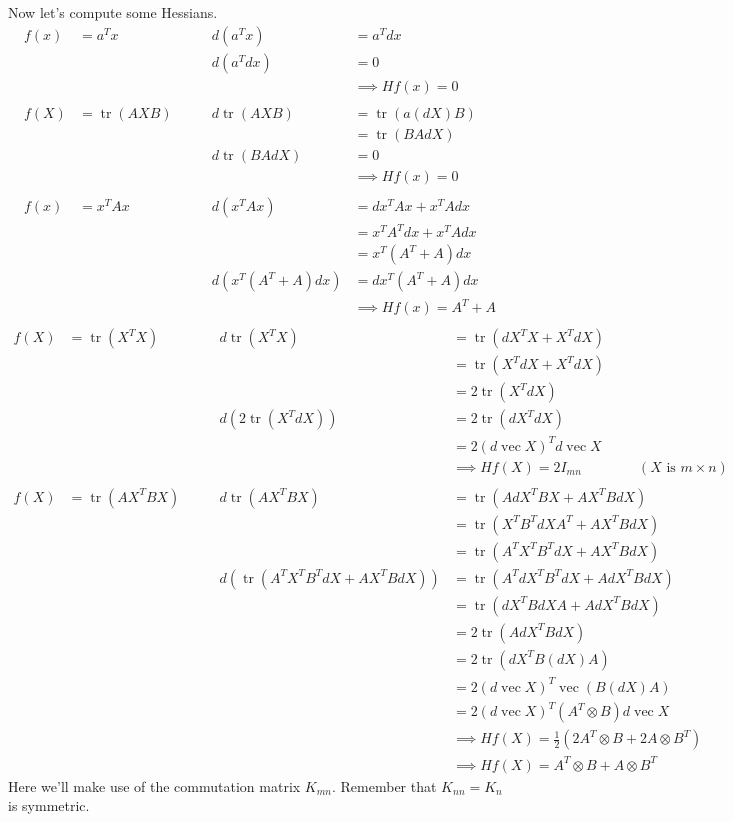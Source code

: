 \documentclass[a4paper,12pt]{article}
\begin{document}
Now let's compute some Hessians.
$$
\begin{alignat}{2}
f(x) &= a^Tx & \qquad d(a^Tx) &= a^Tdx \\
  & & \qquad d(a^Tdx) &= 0 \\
  & & &\implies Hf(x) = 0 \\
\\
f(X) &= \operatorname{tr}(AXB) & \qquad d\operatorname{tr}(AXB) &= \operatorname{tr}(a(dX)B) \\
  & & &= \operatorname{tr}(BAdX) \\
  & & \qquad d\operatorname{tr}(BAdX) &= 0 \\
  & & &\implies Hf(x) = 0 \\
\\
f(x) &= x^TAx & \qquad d(x^TAx) &= dx^TAx + x^TAdx \\
  & & &= x^TA^Tdx + x^TAdx \\
  & & &= x^T(A^T+A)dx \\
  & & \qquad d(x^T(A^T+A)dx) &= dx^T(A^T+A)dx \\
  & & &\implies Hf(x) = A^T + A \\
\end{alignat} $$
$$\begin{alignat}{2}
f(X) &= \operatorname{tr}(X^TX) & \qquad d\operatorname{tr}(X^TX) &= \operatorname{tr}(dX^TX + X^TdX) \\
  & & &= \operatorname{tr}(X^TdX + X^TdX) \\
  & & &= 2\operatorname{tr}(X^TdX) \\
  & & \qquad d(2\operatorname{tr}(X^TdX)) &= 2\operatorname{tr}(dX^TdX) \\
  & & &= 2(d\operatorname{vec}X)^Td\operatorname{vec}X \\
  & & &\implies Hf(X) = 2I_{mn}\qquad\qquad (X\text{ is }m\times n) \\
\\
f(X) &= \operatorname{tr}(AX^TBX) & \qquad d\operatorname{tr}(AX^TBX) &= \operatorname{tr}(AdX^TBX+AX^TBdX) \\
  & & &= \operatorname{tr}(X^TB^TdXA^T + AX^TBdX) \\
  & & &= \operatorname{tr}(A^TX^TB^TdX + AX^TBdX) \\
  & & \qquad d(\operatorname{tr}(A^TX^TB^TdX + AX^TBdX)) &= \operatorname{tr}(A^TdX^TB^TdX+AdX^TBdX) \\
  & & &= \operatorname{tr}(dX^TBdXA + AdX^TBdX) \\
  & & &= 2\operatorname{tr}(AdX^TBdX) \\
  & & &= 2\operatorname{tr}(dX^TB(dX)A) \\
  & & &= 2(d\operatorname{vec}X)^T\operatorname{vec}(B(dX)A) \\
  & & &= 2(d\operatorname{vec}X)^T(A^T\otimes B)d\operatorname{vec}X \\
  & & &\implies Hf(X) = \frac{1}{2}(2A^T\otimes B + 2A\otimes B^T) \\
  & & &\implies Hf(X) = A^T\otimes B + A\otimes B^T
\end{alignat}
$$ Here we'll make use of the commutation matrix $K_{mn}$. Remember that $K_{nn} = K_n$ is symmetric.
\end{document}
